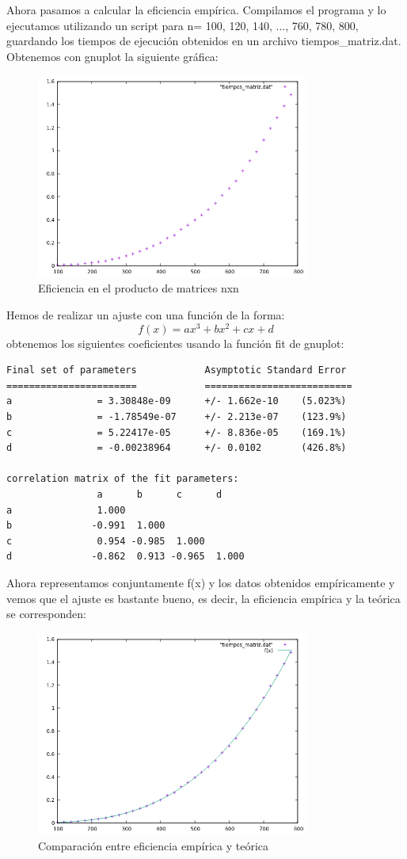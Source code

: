 \documentclass{article}
\begin{document}
Ahora pasamos a calcular la eficiencia empírica. Compilamos el programa y lo ejecutamos utilizando un script para n= 100, 120, 140, ..., 760, 780, 800, guardando los tiempos de ejecución obtenidos en un archivo tiempos\_matriz.dat. Obtenemos con gnuplot la siguiente gráfica:
\begin{figure}[H]
  \caption{Eficiencia en el producto de matrices nxn}
  \centering
  \includegraphics[width=0.8\textwidth]{graficaefic.png}
\end{figure}
Hemos de realizar un ajuste con una función de la forma:
\[
  f(x)=ax^{3}+bx^{2}+cx+d
\]
obtenemos los siguientes coeficientes usando la función fit de gnuplot:
\begin{verbatim}
Final set of parameters            Asymptotic Standard Error
=======================            ==========================
a               = 3.30848e-09      +/- 1.662e-10    (5.023%)
b               = -1.78549e-07     +/- 2.213e-07    (123.9%)
c               = 5.22417e-05      +/- 8.836e-05    (169.1%)
d               = -0.00238964      +/- 0.0102       (426.8%)

correlation matrix of the fit parameters:
                a      b      c      d      
a               1.000 
b              -0.991  1.000 
c               0.954 -0.985  1.000 
d              -0.862  0.913 -0.965  1.000 
\end{verbatim}
Ahora representamos conjuntamente f(x) y los datos obtenidos empíricamente y vemos que el ajuste es bastante bueno, es decir, la eficiencia empírica y la teórica se corresponden:
\begin{figure}[H]
  \caption{Comparación entre eficiencia empírica y teórica}
  \centering
  \includegraphics[width=0.8\textwidth]{graficafit.png}
\end{figure}
\clearpage
\end{document}
